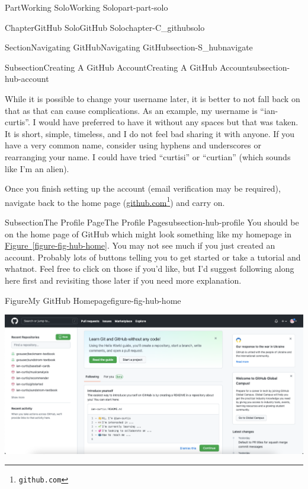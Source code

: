 \documentclass[oneside,10pt,]{book}
\newcommand{\xreffont}{\relax}
\begin{document}
\begin{partptx}{Part}{Working Solo}{}{Working Solo}{}{}{part-part-solo}
\begin{chapterptx}{Chapter}{GitHub Solo}{}{GitHub Solo}{}{}{chapter-C_githubsolo}
\begin{sectionptx}{Section}{Navigating GitHub}{}{Navigating GitHub}{}{}{section-S_hubnavigate}
\begin{subsectionptx}{Subsection}{Creating A GitHub Account}{}{Creating A GitHub Account}{}{}{subsection-hub-account}
\begin{enumerate}
\begin{itemize}[label=\textbullet]
\end{itemize}
While it is possible to change your username later, it is better to not fall back on that as that can cause complications. As an example, my username is ``ian-curtis''. I would have preferred to have it without any spaces but that was taken. It is short, simple, timeless, and I do not feel bad sharing it with anyone. If you have a very common name, consider using hyphens and underscores or rearranging your name. I could have tried ``curtisi'' or ``curtian'' (which sounds like I'm an alien).%
\end{enumerate}
%
\par
Once you finish setting up the account (email verification may be required), navigate back to the home page (\href{https://github.com}{github.com}\footnote{\nolinkurl{github.com}\label{fn-hub-account-f-b}}) and carry on.%
\end{subsectionptx}
%
%
\typeout{************************************************}
\typeout{************************************************}
%
\begin{subsectionptx}{Subsection}{The Profile Page}{}{The Profile Page}{}{}{subsection-hub-profile}
%
%
%
%
%
You should be on the home page of GitHub which might look something like my homepage in \hyperref[figure-fig-hub-home]{Figure~{\xreffont\ref{figure-fig-hub-home}}}. You may not see much if you just created an account. Probably lots of buttons telling you to get started or take a tutorial and whatnot. Feel free to click on those if you'd like, but I'd suggest following along here first and revisiting those later if you need more explanation.%
\begin{figureptx}{Figure}{My GitHub Homepage}{figure-fig-hub-home}{}%
\begin{image}{0.05}{0.9}{0.05}{}%
\includegraphics[width=\linewidth]{external/hub_home.pdf}

\end{image}
\end{figureptx}
\end{subsectionptx}
\end{sectionptx}
\end{chapterptx}
\end{partptx}
\end{document}
